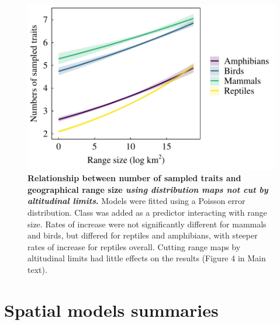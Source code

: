 \begin{figure}[h!]
\centering
\includegraphics[scale=0.7]{Supporting/Chapter2/Figures/Plot_BeforeCuttingRS}
\caption[Relationship between number of sampled traits and geographical range size using distribution maps not cut by altitudina limits.]{\textbf{Relationship between number of sampled traits and geographical range size \textit{using distribution maps not cut by altitudinal limits}.} Models were fitted using a Poisson error distribution. Class was added as a predictor interacting with range size. Rates of increase were not significantly different for mammals and birds, but differed for reptiles and amphibians, with steeper rates of increase for reptiles overall. Cutting range maps by altitudinal limits had little effects on the results (Figure 4 in Main text).} 
\label{}
\end{figure}


\newpage
\pagebreak
\clearpage



\section{Spatial models summaries}

